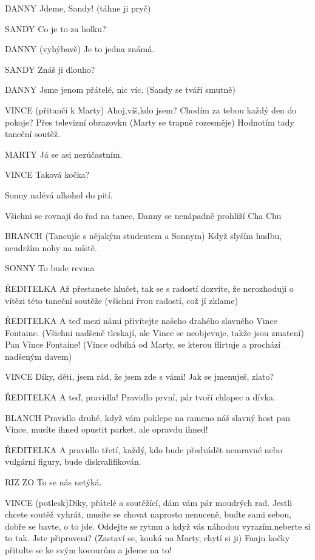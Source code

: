DANNY        Jdeme, Sandy! (táhne ji pryč)

SANDY         Co je to za holku? 

DANNY        (vyhýbavě) Je to jedna známá.  

SANDY        Znáš ji dlouho? 

DANNY        Jsme jenom přátelé, nic víc. (Sandy se tváří smutně) 

VINCE        (přitančí k Marty) Ahoj,víš,kdo jsem? Chodím za tebou každý den do pokoje? Přes televizní obrazovku (Marty se trapně rozesměje) Hodnotím tady taneční soutěž. 

MARTY        Já se asi nezúčastním.

VINCE        Taková kočka? 

Sonny nalévá alkohol do pití.

Všichni se rovnají do řad na tanec, Danny se nenápadně prohlíží Cha Chu 

BRANCH (Tancujíc s nějakým studentem a Sonnym) Když slyším hudbu, neudržím nohy na místě. 

SONNY        To bude revma

ŘEDITELKA         Až přestanete hlučet, tak se s radostí dozvíte, že nerozhoduji o vítězi této taneční soutěže (všichni řvou radostí, což jí zklame) 

ŘEDITELKA        A teď mezi námi přivítejte našeho drahého slavného Vince Fontaine. (Všichni nadšeně tleskají, ale Vince se neobjevuje, takže jsou zmatení) Pan Vince Fontaine! (Vince odbíhá od Marty, se kterou flirtuje a prochází nadšeným davem) 

VINCE        Díky, děti, jsem rád, že jsem zde s vámi! Jak se jmenuješ, zlato? 

ŘEDITELKA        A teď, pravidla!         Pravidlo první, pár tvoří chlapec a dívka. 

BLANCH            Pravidlo druhé, když vám poklepe na rameno náš slavný host pan Vince, musíte ihned opustit parket, ale opravdu ihned! 

ŘEDITELKA        A pravidlo třetí, každý, kdo bude předvádět nemravné nebo vulgární         figury, bude diskvalifikován. 

RIZ        ZO        To se nás netýká. 

VINCE        (potlesk)Díky, přátelé a soutěžící, dám vám pár moudrých rad. Jestli                 chcete soutěž vyhrát, musíte se chovat naprosto nenuceně, buďte sami         sebou, dobře se bavte, o to jde. Oddejte se rytmu a když vás náhodou         vyrazím.neberte si to tak. Jste  připraveni? (Zastaví se, kouká na Marty,         chytí si ji) Faajn kočky přitulte se ke svým kocourům a jdeme na to!

